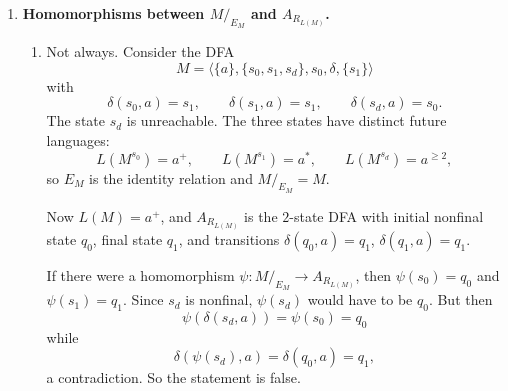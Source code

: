 \begin{enumerate}[{3.}1.]
\begin{enumerate}
\item If $R$ refines $E_A$, then $A/_R$ is well defined exactly when $R$ is
stable under the transitions:
\[
sRt \Rightarrow \delta(s,a)R\delta(t,a)
\]
for every $a\in\Sigma$.

For such well-defined refinements $R$, the analogues of Theorems 3.4, 3.5, and
3.6 behave as follows.

\textit{Analogue of Theorem 3.4}: false in general. Take $R$ to be the identity
relation on the states of a DFA $A$ that is not reduced. Then $R$ certainly
refines $E_A$, and $A/_R=A$, which is not reduced.

\textit{Analogue of Theorem 3.5}: true. If $A$ is connected and $[s]_R$ is a
state of $A/_R$, choose $x$ with $\DBAR(s_0,x)=s$. Since $A/_R$ is well defined,
\[
\DBAR_R([s_0]_R,x)=[\DBAR(s_0,x)]_R=[s]_R,
\]
so every state class is reachable.

\textit{Analogue of Theorem 3.6}: true. Because $R$ refines $E_A$, every
$R$-class is contained in a single $E_A$-class, so no $R$-class mixes final and
nonfinal states; hence $F_R$ is well defined. Compute directly:
\[
x\in L(A/_R)
\Leftrightarrow \DBAR_R([s_0]_R,x)\in F_R
\Leftrightarrow [\DBAR(s_0,x)]_R\in F_R
\Leftrightarrow \DBAR(s_0,x)\in F
\Leftrightarrow x\in L(A).
\]
Thus $L(A/_R)=L(A)$.
\end{enumerate}

\item \textbf{Homomorphisms between $M/_{E_M}$ and $A_{R_{L(M)}}$.}

\begin{enumerate}
\item Not always. Consider the DFA
\[
M=\langle\{a\},\{s_0,s_1,s_d\},s_0,\delta,\{s_1\}\rangle
\]
with
\[
\delta(s_0,a)=s_1,\qquad \delta(s_1,a)=s_1,\qquad \delta(s_d,a)=s_0.
\]
The state $s_d$ is unreachable. The three states have distinct future languages:
\[
L(M^{s_0})=a^+,\qquad L(M^{s_1})=a^*,\qquad L(M^{s_d})=a^{\ge 2},
\]
so $E_M$ is the identity relation and $M/_{E_M}=M$.

Now $L(M)=a^+$, and $A_{R_{L(M)}}$ is the $2$-state DFA with initial
nonfinal state $q_0$, final state $q_1$, and transitions
$\delta(q_0,a)=q_1$, $\delta(q_1,a)=q_1$.

If there were a homomorphism $\psi:M/_{E_M}\to A_{R_{L(M)}}$, then
$\psi(s_0)=q_0$ and $\psi(s_1)=q_1$. Since $s_d$ is nonfinal, $\psi(s_d)$ would
have to be $q_0$. But then
\[
\psi(\delta(s_d,a))=\psi(s_0)=q_0
\]
while
\[
\delta(\psi(s_d),a)=\delta(q_0,a)=q_1,
\]
a contradiction. So the statement is false.


\end{enumerate}
\end{enumerate}
